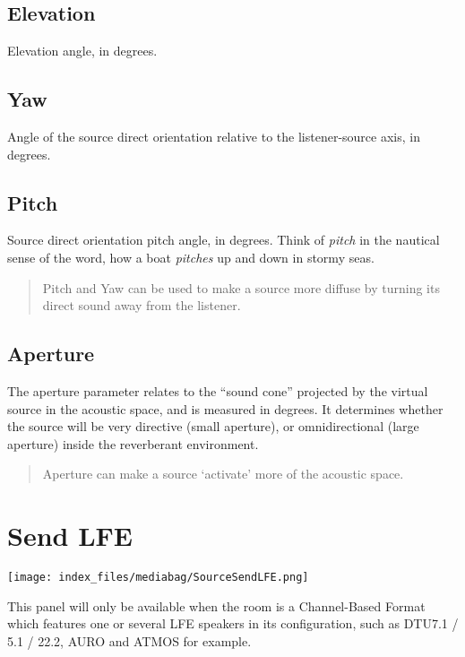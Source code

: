 \documentclass[
  letterpaper,
  DIV=11,
  numbers=noendperiod]{scrreport}
\begin{document}
\hypertarget{elevation}{%
\subsection{Elevation}\label{elevation}}

Elevation angle, in degrees.

\hypertarget{yaw}{%
\subsection{Yaw}\label{yaw}}

Angle of the source direct orientation relative to the listener-source
axis, in degrees.

\hypertarget{pitch}{%
\subsection{Pitch}\label{pitch}}

Source direct orientation pitch angle, in degrees. Think of \emph{pitch}
in the nautical sense of the word, how a boat \emph{pitches} up and down
in stormy seas.

\begin{quote}
Pitch and Yaw can be used to make a source more diffuse by turning its
direct sound away from the listener.
\end{quote}

\hypertarget{aperture}{%
\subsection{Aperture}\label{aperture}}

The aperture parameter relates to the ``sound cone'' projected by the
virtual source in the acoustic space, and is measured in degrees. It
determines whether the source will be very directive (small aperture),
or omnidirectional (large aperture) inside the reverberant environment.

\begin{quote}
Aperture can make a source `activate' more of the acoustic space.
\end{quote}

\hypertarget{send-lfe}{%
\section{Send LFE}\label{send-lfe}}

\texttt{[image: index\_files/mediabag/SourceSendLFE.png]}

This panel will only be available when the room is a Channel-Based
Format which features one or several LFE speakers in its configuration,
such as DTU7.1 / 5.1 / 22.2, AURO and ATMOS for example.
\end{document}
